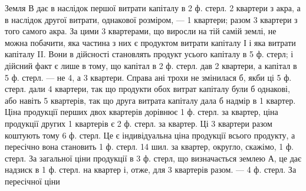 
Земля В дає в наслідок першої витрати капіталу в 2 ф. стерл. 2 квартери
з акра, а в наслідок другої витрати, однакової розміром, — 1 квартери; разом
3 квартери з того самого акра. За цими 3 квартерами, що виросли
на тій самій землі, не можна побачити, яка частина з них є продуктом витрати
капіталу І і яка витрати капіталу II. Вони в дійсності становлять продукт
усього капіталу в 5 ф. стерл; і дійсний факт є лише в тому, що капітал
в 2 ф. стерл. дав 2 квартери, а капітал в 5 ф. стерл. — не 4, а 3 квартери.
Справа ані трохи не змінилася б, якби ці 5 ф. стерл. дали 4 квартери, так що
продукти обох витрат капіталу були б однакові, або навіть 5 квартерів, так
що друга витрата капіталу дала б надмір в 1 квартер. Ціна продукції перших
двох квартерів дорівнює 1 ф. стерл. за квартер, ціна продукції других 1 квартерів є 2 ф.
стерл. за квартер. Ці 3 квартери разом коштують тому 6 ф. стерл.
Це є індивідуальна ціна продукції всього продукту, а пересічно вона становить
1 ф. стерл. 14 шил. за квартер, округло, скажімо, 1 ф. стерл. За загальної ціни
продукції в 3 ф. стерл, що визначається землею А, це дає надзиск в 1 ф. стерл.
на квартер і, отже, для 3 квартерів разом. — 4 ф. стерл. За пересічної ціни
\parbreak{}  %
